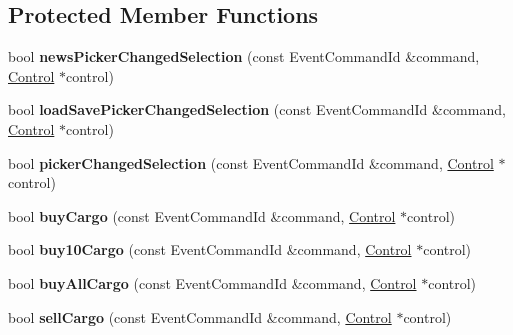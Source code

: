 \subsection*{Protected Member Functions}
\begin{DoxyCompactItemize}
\item 
bool {\bfseries news\+Picker\+Changed\+Selection} (const Event\+Command\+Id \&command, \hyperlink{classControl}{Control} $\ast$control)\hypertarget{classBaseComputer_a1c12c0535b19bbd0619ff6c418ef673c}{}\label{classBaseComputer_a1c12c0535b19bbd0619ff6c418ef673c}

\item 
bool {\bfseries load\+Save\+Picker\+Changed\+Selection} (const Event\+Command\+Id \&command, \hyperlink{classControl}{Control} $\ast$control)\hypertarget{classBaseComputer_a92115302861f81e89e6784dd7d45f422}{}\label{classBaseComputer_a92115302861f81e89e6784dd7d45f422}

\item 
bool {\bfseries picker\+Changed\+Selection} (const Event\+Command\+Id \&command, \hyperlink{classControl}{Control} $\ast$control)\hypertarget{classBaseComputer_a2785ba846aabf71b7ee00a115ad3ef51}{}\label{classBaseComputer_a2785ba846aabf71b7ee00a115ad3ef51}

\item 
bool {\bfseries buy\+Cargo} (const Event\+Command\+Id \&command, \hyperlink{classControl}{Control} $\ast$control)\hypertarget{classBaseComputer_a278960c1622fc83812773f88d3513d31}{}\label{classBaseComputer_a278960c1622fc83812773f88d3513d31}

\item 
bool {\bfseries buy10\+Cargo} (const Event\+Command\+Id \&command, \hyperlink{classControl}{Control} $\ast$control)\hypertarget{classBaseComputer_ab774c11c83238da7c53264ad482d9d1d}{}\label{classBaseComputer_ab774c11c83238da7c53264ad482d9d1d}

\item 
bool {\bfseries buy\+All\+Cargo} (const Event\+Command\+Id \&command, \hyperlink{classControl}{Control} $\ast$control)\hypertarget{classBaseComputer_a70a576ad472cea8ef8300fb461066090}{}\label{classBaseComputer_a70a576ad472cea8ef8300fb461066090}

\item 
bool {\bfseries sell\+Cargo} (const Event\+Command\+Id \&command, \hyperlink{classControl}{Control} $\ast$control)\hypertarget{classBaseComputer_aaad6521ed2972f0d40d518e60f97d4a8}{}\label{classBaseComputer_aaad6521ed2972f0d40d518e60f97d4a8}


\end{DoxyCompactItemize}
